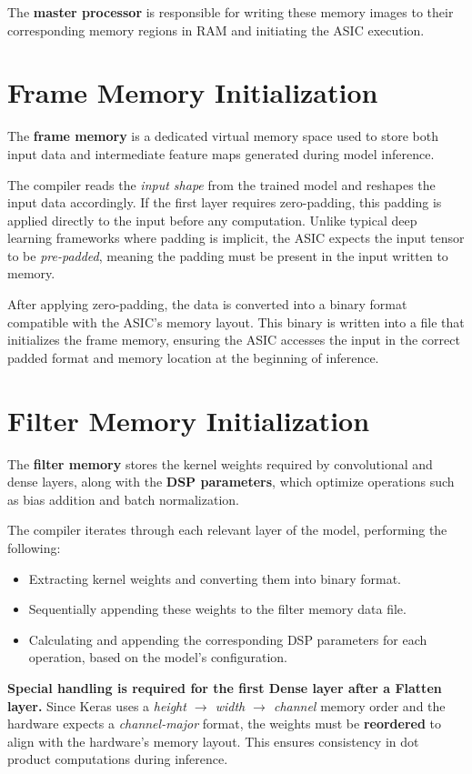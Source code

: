 \documentclass[12pt]{report}
\begin{document}
The \textbf{master processor} is responsible for writing these memory images to their corresponding memory regions in RAM and initiating the ASIC execution.

\section{Frame Memory Initialization}

The \textbf{frame memory} is a dedicated virtual memory space used to store both input data and intermediate feature maps generated during model inference.

The compiler reads the \textit{input shape} from the trained model and reshapes the input data accordingly. If the first layer requires zero-padding, this padding is applied directly to the input before any computation. Unlike typical deep learning frameworks where padding is implicit, the ASIC expects the input tensor to be \textit{pre-padded}, meaning the padding must be present in the input written to memory.

After applying zero-padding, the data is converted into a binary format compatible with the ASIC's memory layout. This binary is written into a file that initializes the frame memory, ensuring the ASIC accesses the input in the correct padded format and memory location at the beginning of inference.

\section{Filter Memory Initialization}

The \textbf{filter memory} stores the kernel weights required by convolutional and dense layers, along with the \textbf{DSP parameters}, which optimize operations such as bias addition and batch normalization.

The compiler iterates through each relevant layer of the model, performing the following:
\begin{itemize}
    \item Extracting kernel weights and converting them into binary format.
    \item Sequentially appending these weights to the filter memory data file.
    \item Calculating and appending the corresponding DSP parameters for each operation, based on the model’s configuration.
\end{itemize}

\textbf{Special handling is required for the first Dense layer after a Flatten layer.} Since Keras uses a \textit{height $\rightarrow$ width $\rightarrow$ channel} memory order and the hardware expects a \textit{channel-major} format, the weights must be \textbf{reordered} to align with the hardware's memory layout. This ensures consistency in dot product computations during inference.
\end{document}
